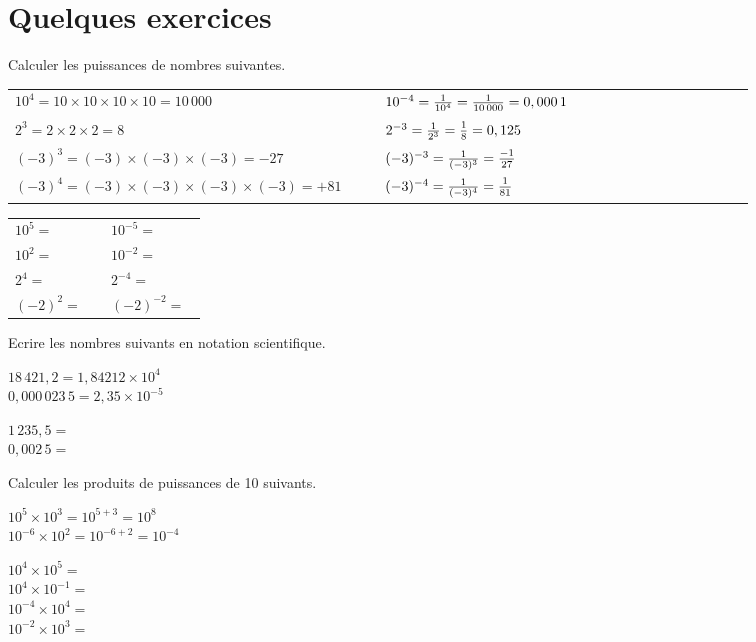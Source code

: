 \documentclass[10pt]{article}
\begin{document}
{\section{Quelques exercices}
\begin{Exo}
Calculer les puissances de nombres  suivantes.
\begin{Ex}
\begin{tabular}{p{0.46\linewidth}|p{0.46\linewidth}}
$10^4=10\times10\times10\times10=10\,000$
&
$10^{-4}={1\over10^4}={1\over10\,000\mathstrut}=0,000\,1$\\
$2^3=2\times2\times2=8$
&
$2^{-3}={1\over2^3}={\mathstrut1\over8\mathstrut}=0,125$\\
$(-3)^3=(-3)\times(-3)\times(-3)=-27$
&
$(-3)^{-3}={1\over(-3)^3}={\mathstrut-1\over27}$\\
$(-3)^4=(-3)\times(-3)\times(-3)\times(-3)=+81$
&
$(-3)^{-4}={1\over(-3)^4}={\mathstrut1\over81}$\\
\end{tabular}
\end{Ex}
\begin{tabular}{p{0.46\linewidth}p{0.46\linewidth}}
$10^5=$ & $10^{-5}=$\\
$10^2=$ & $10^{-2}=$\\
$2^4=$ & $2^{-4}=$\\
$(-2)^2=$ & $(-2)^{-2}=$\\
\end{tabular}
\end{Exo}

\begin{Exo}
Ecrire les nombres suivants en notation scientifique.
\begin{Ex}
$18\,421,2=1,84212\times10^4$\\
$0,000\,023\,5=2,35\times10^{-5}$
\end{Ex}
$1\,235,5=$\\
$0,002\,5=$
\end{Exo}

\begin{Exo}
Calculer les produits de puissances de 10 suivants.
\begin{Ex}
$10^5\times10^3=10^{5+3}=10^8$\\
$10^{-6}\times10^2=10^{-6+2}=10^{-4}$
\end{Ex}
\def\ecrp#1#2{$10^{#1}\times10^{#2}=$}
\ecrp45\\
\ecrp4{-1}\\
\ecrp{-4}4\\
\ecrp{-2}{3}
\end{Exo}

}
\end{document}
